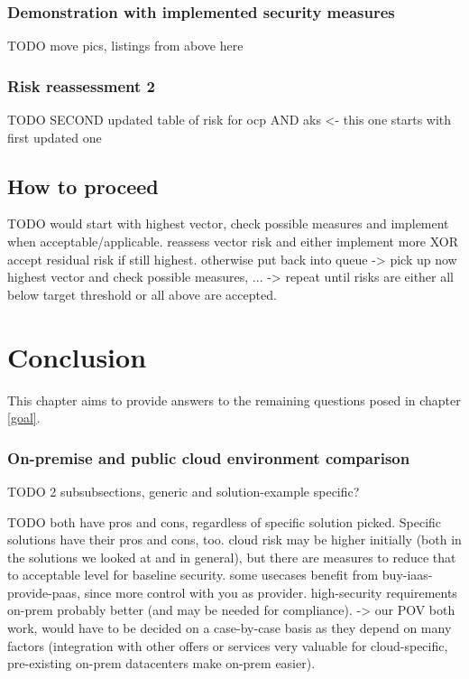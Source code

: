 \subsection{Demonstration with implemented security measures}


TODO move pics, listings from above here

\subsection{Risk reassessment 2}

TODO SECOND updated table of risk for ocp AND aks <- this one starts with first updated one

\section{How to proceed}

TODO would start with highest vector, check possible measures and implement when acceptable/applicable. reassess vector risk and either implement more XOR accept residual risk if still highest. otherwise put back into queue -> pick up now highest vector and check possible measures, ... -> repeat until risks are either all below target threshold or all above are accepted.

\chapter{Conclusion}
This chapter aims to provide answers to the remaining questions posed in chapter \ref{goal}.

\subsection{On-premise and public cloud environment comparison}
TODO 2 subsubsections, generic and solution-example specific?

TODO both have pros and cons, regardless of specific solution picked.  Specific solutions have their pros and cons, too. cloud risk may be higher initially (both in the solutions we looked at and in general), but there are measures to reduce that to acceptable level for baseline security. some usecases benefit from buy-iaas-provide-paas, since more control with you as provider. high-security requirements on-prem probably better (and may be needed for compliance).
-> our POV both work, would have to be decided on a case-by-case basis as they depend on many factors (integration with other offers or services very valuable for cloud-specific, pre-existing on-prem datacenters make on-prem easier).

